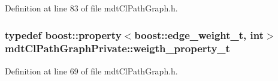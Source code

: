 Definition at line 83 of file mdt\-Cl\-Path\-Graph.\-h.

\hypertarget{namespacemdt_cl_path_graph_private_a9ecaa62d3daff29e2314dec1780dbc21}{
\subsubsection[{weigth\-\_\-property\-\_\-t}]{\setlength{\rightskip}{0pt plus 5cm}typedef boost\-::property$<$boost\-::edge\-\_\-weight\-\_\-t, int$>$ {\bf mdt\-Cl\-Path\-Graph\-Private\-::weigth\-\_\-property\-\_\-t}}}\label{namespacemdt_cl_path_graph_private_a9ecaa62d3daff29e2314dec1780dbc21}


Definition at line 69 of file mdt\-Cl\-Path\-Graph.\-h.


